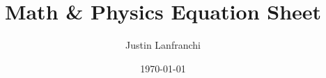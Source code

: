 \documentclass[letterpaper,landscape,10pt]{article}
\title{Math \& Physics Equation Sheet}
\author{Justin Lanfranchi}
\date{\today}
\newif\iftechexplorer\techexplorerfalse
\begin{document}
{
\raggedright


\fontsize{6}{1}\selectfont %

\begin{multicols}{4}


\iftechexplorer
  \maketitle
\fi


\end{multicols}}
\end{document}
